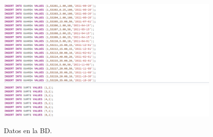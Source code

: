 \documentclass[12pt,letterpaper]{article}
\begin{document}
	\begin{figure}[H]
		\centering
		\includegraphics[scale=0.50]{Documentacion/img/valores4.PNG}
		\includegraphics[scale=0.50]{Documentacion/img/valores5.PNG}
		\caption{Datos en la BD.}
	\end{figure}
	
\end{document}
